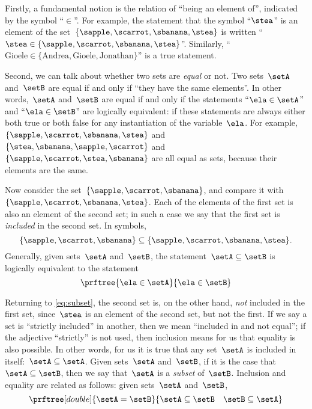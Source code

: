 Firstly, a fundamental notion is the relation of ``being an element of'', indicated by the symbol ``$\in$''.
For example, the statement that the symbol ``$\stea$'' is an element of the set~$\{ \sapple, \scarrot, \sbanana, \stea \}$ is written ``$\stea \in \{ \sapple, \scarrot, \sbanana, \stea \}$''.
Similarly, ``$\text{Gioele} \in \{ \text{Andrea}, \text{Gioele}, \text{Jonathan} \}$'' is a true statement.

Second, we can talk about whether two sets are \emph{equal} or not.
Two sets~$\setA$ and~$\setB$ are equal if and only if ``they have the same elements''.
In other words,~$\setA$ and~$\setB$ are equal if and only if the statements
``$\ela \in \setA$'' and ``$\ela \in \setB$'' are logically equivalent:
if these statements are always either both true or both false for any instantiation of the variable~$\ela$.
For example, $\{ \sapple, \scarrot, \sbanana, \stea \}$ and~$\{ \stea, \sbanana, \sapple, \scarrot\}$ and~$\{ \sapple, \scarrot, \stea, \sbanana \}$ are all equal as sets, because their elements are the same.

Now consider the set~$\{ \sapple, \scarrot, \sbanana \}$, and compare it with~$\{ \sapple, \scarrot, \sbanana, \stea \}$.
Each of the elements of the first set is also an element of the second set;
in such a case we say that the first set is \emph{included} in the second set.
In symbols,
%
\begin{equation}
    \label{eq:subset}
    \{ \sapple, \scarrot, \sbanana \} \subseteq \{ \sapple, \scarrot, \sbanana, \stea \}.
\end{equation}
%
Generally, given sets~$\setA$ and~$\setB$, the statement~$\setA \subseteq \setB$ is logically equivalent to the statement
%
\begin{equation*}
    \prftree{\ela \in \setA}{\ela \in \setB}
\end{equation*}

Returning to \cref{eq:subset}, the second set is, on the other hand, \emph{not} included in the first set, since~$\stea$ is an element of the second set, but not the first.
If we say a set is ``strictly included'' in another, then we mean ``included in and not equal'';
if the adjective ``strictly'' is not used, then inclusion means for us that equality is also possible.
In other words, for us it is true that any set~$\setA$ is included in itself:~$\setA \subseteq \setA$.
Given sets~$\setA$ and~$\setB$, if it is the case that~$\setA \subseteq \setB$, then we say that~$\setA$ is a \emph{subset} of~$\setB$.
Inclusion and equality are related as follows: given sets~$\setA$ and~$\setB$,
\begin{equation*}
    \prftree[double]{\setA = \setB}{{\setA \subseteq \setB}\quad{\setB \subseteq \setA}}
\end{equation*}

